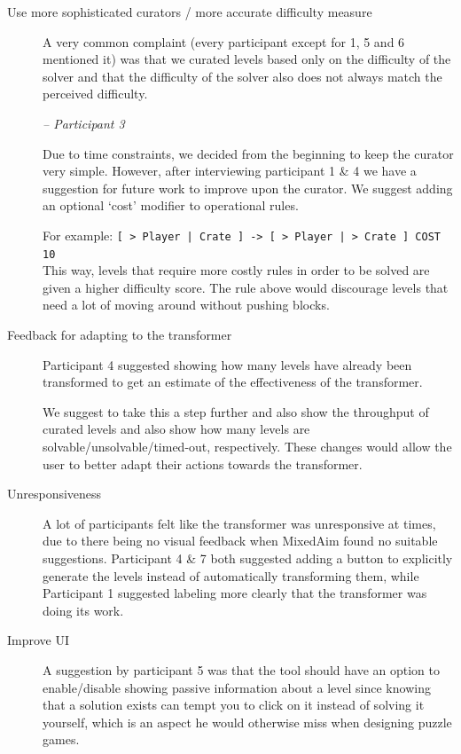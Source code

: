 \begin{description}
    \item[Use more sophisticated curators / more accurate difficulty measure]
A very common complaint (every participant except for 1, 5 and 6 mentioned it) was that we curated levels based only on the difficulty of the solver and that the difficulty of the solver also does not always match the perceived difficulty.

\textit{ -- Participant 3}

Due to time constraints, we decided from the beginning to keep the curator very simple. However, after interviewing participant 1 \& 4 we have a suggestion for future work to improve upon the curator. We suggest adding an optional `cost' modifier to operational rules. 

 For example: \lstinline{[ > Player | Crate ] -> [ > Player | > Crate ] COST 10} \hfill \\
 This way, levels that require more costly rules in order to be solved are given a higher difficulty score. The rule above would discourage levels that need a lot of moving around without pushing blocks.

 

    \item[Feedback for adapting to the transformer]
    Participant 4 suggested showing how many levels have already been transformed to get an estimate of the effectiveness of the transformer.
    
    We suggest to take this a step further and also show the throughput of curated levels and also show how many levels are solvable/unsolvable/timed-out, respectively. These changes would allow the user to better adapt their actions towards the transformer. 
    
    \item[Unresponsiveness]
    A lot of participants felt like the transformer was unresponsive at times, due to there being no visual feedback when MixedAim found no suitable suggestions. Participant 4 \& 7 both suggested adding a button to explicitly generate the levels instead of automatically transforming them, while Participant 1 suggested labeling more clearly that the transformer was doing its work.
    
    \item[Improve UI] A suggestion by participant 5 was that the tool should have an option to enable/disable showing passive information about a level since knowing that a solution exists can tempt you to click on it instead of solving it yourself, which is an aspect he would otherwise miss when designing puzzle games.
     

\end{description}
